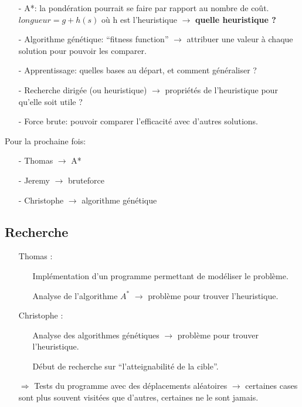 \documentclass[a4paper,10pt]{article}
\begin{document}
\begin{itemize}
  \item[-]A*: la pondération pourrait se faire par rapport au nombre de coût.
	    \\$longueur = g + h(s)$ où h est l'heuristique $\rightarrow$ \textbf{quelle heuristique ?}
  \item[-]Algorithme génétique: ``fitness function'' $\rightarrow$ attribuer une valeur à chaque solution pour pouvoir les comparer.
  \item[-]Apprentissage: quelles bases au départ, et comment généraliser ?
  \item[-]Recherche dirigée (ou heuristique) $\rightarrow$ propriétés de l'heuristique pour qu'elle soit utile ?
  \item[-]Force brute: pouvoir comparer l'efficacité avec d'autres solutions.
\end{itemize}

\vspace{1cm} Pour la prochaine fois:
\begin{itemize}
  \item[-]Thomas $\rightarrow$ A*
  \item[-]Jeremy $\rightarrow$ bruteforce
  \item[-]Christophe $\rightarrow$ algorithme génétique
\end{itemize}

\subsection{Recherche}
  \begin{itemize}
    \item[Thomas : ]
      \begin{itemize}
        \item[\dag]Impl\'ementation d'un programme permettant de mod\'eliser le probl\`eme.
        \item[\dag]Analyse de l'algorithme $A^*$ $\rightarrow$ probl\`eme pour trouver l'heuristique.
      \end{itemize}
    \item[Christophe : ]
      \begin{itemize}
        \item[\dag]Analyse des algorithmes g\'en\'etiques \cite{MOP} $\rightarrow$ probl\`eme pour trouver l'heuristique.
        \item[\dag]D\'ebut de recherche sur ``l'atteignabilit\'e de la cible''.
      \end{itemize}

    \item[$\Rightarrow$] Tests du programme avec des d\'eplacements al\'eatoires $\rightarrow$ certaines cases sont plus souvent visit\'ees que d'autres, certaines ne le sont jamais.
  \end{itemize}
\end{document}
